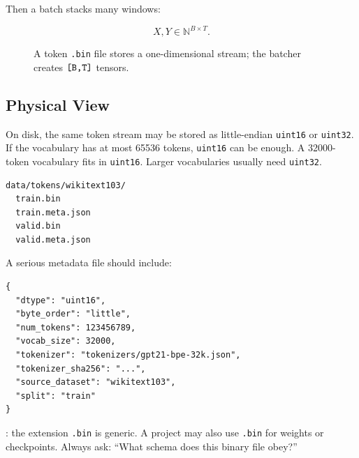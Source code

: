 Then a batch stacks many windows:

\[
X,Y \in \mathbb{N}^{B\times T}.
\]

\begin{figure}[htbp]
\centering
{}
\caption{A token \texttt{.bin} file stores a one-dimensional stream; the batcher creates \(\texttt{[B,T]}\) tensors.}
\end{figure}

\subsection{Physical View}

On disk, the same token stream may be stored as little-endian \texttt{uint16} or
\texttt{uint32}. If the vocabulary has at most 65536 tokens, \texttt{uint16} can be
enough. A 32000-token vocabulary fits in \texttt{uint16}. Larger vocabularies usually need
\texttt{uint32}.

\begin{lstlisting}
data/tokens/wikitext103/
  train.bin
  train.meta.json
  valid.bin
  valid.meta.json
\end{lstlisting}

A serious metadata file should include:

\begin{lstlisting}
{
  "dtype": "uint16",
  "byte_order": "little",
  "num_tokens": 123456789,
  "vocab_size": 32000,
  "tokenizer": "tokenizers/gpt21-bpe-32k.json",
  "tokenizer_sha256": "...",
  "source_dataset": "wikitext103",
  "split": "train"
}
\end{lstlisting}

: the extension \texttt{.bin} is generic. A project may also use
\texttt{.bin} for weights or checkpoints. Always ask: ``What schema does this binary file
obey?''

